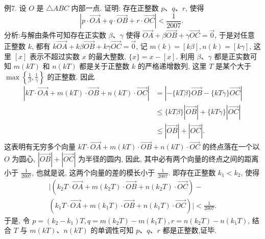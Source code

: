 例7. 设 $O$ 是 $\triangle A B C$ 内部一点.
证明: 存在正整数 $p 、 q 、 r$, 使得
$$
|p \cdot \overrightarrow{O A}+q \cdot \overrightarrow{O B}+r \cdot \overrightarrow{O C}|<\frac{1}{2007} \text {. }
$$
分析:与解由条件可知存在正实数 $\beta 、 \gamma$ 使得 $\overrightarrow{O A}+\beta \overrightarrow{O B}+\gamma \overrightarrow{O C}=\overrightarrow{0}$, 于是对任意正整数 $k$, 都有 $k \overrightarrow{O A}+k \beta \overrightarrow{O B}+k \gamma \overrightarrow{O C}=\overrightarrow{0}$, 记 $m(k)=[k \beta], n(k)= [k \gamma]$, 这里 $[x]$ 表示不超过实数 $x$ 的最大整数, $\{x\}=x-[x]$.
利用 $\beta 、 \gamma$ 都是正实数可知 $m(k T)$ 和 $n(k T)$ 都是关于正整数 $k$ 的严格递增数列, 这里 $T$ 是某个大于 $\max \left\{\frac{1}{\beta}, \frac{1}{\gamma}\right\}$ 的正整数.
因此
$$
\begin{aligned}
|k T \cdot \overrightarrow{O A}+m(k T) \cdot \overrightarrow{O B}+n(k T) \cdot \overrightarrow{O C}| & =|-\{k T \beta\} \overrightarrow{O B}-\{k T \gamma\} \overrightarrow{O C}| \\
& \leqslant\{k T \beta\}|\overrightarrow{O B}|+\{k T \gamma\}|\overrightarrow{O C}| \\
& \leqslant|\overrightarrow{O B}|+|\overrightarrow{O C}| .
\end{aligned}
$$
这表明有无穷多个向量 $k T \cdot \overrightarrow{O A}+m(k T) \cdot \overrightarrow{O B}+n(k T) \cdot \overrightarrow{O C}$ 的终点落在一个以 $O$ 为圆心, $|\overrightarrow{O B}|+|\overrightarrow{O C}|$ 为半径的圆内, 因此, 其中必有两个向量的终点之间的距离小于 $\frac{1}{2007}$, 也就是说, 这两个向量的差的模长小于 $\frac{1}{2007}$. 即存在正整数 $k_1<k_2$, 使得
$$
\begin{gathered}
\mid\left(k_2 T \cdot \overrightarrow{O A}+m\left(k_2 T\right) \cdot \overrightarrow{O B}+n\left(k_2 T\right) \cdot \overrightarrow{O C}\right)- \\
\left(k_1 T \cdot \overrightarrow{O A}+m\left(k_1 T\right) \cdot \overrightarrow{O B}+n\left(k_1 T\right) \cdot \overrightarrow{O C}\right) \mid<\frac{1}{2007} .
\end{gathered}
$$
于是, 令 $p=\left(k_2-k_1\right) T, q=m\left(k_2 T\right)-m\left(k_1 T\right), r=n\left(k_2 T\right)-n\left(k_1 T\right)$, 结合 $T$ 与 $m(k T) 、 n(k T)$ 的单调性可知 $p 、 q 、 r$ 都是正整数,证毕.


